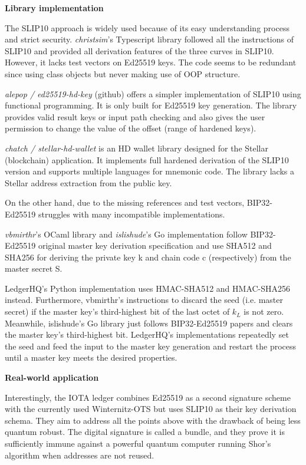 \bigskip
{\textbf{Library implementation}}

The SLIP10 approach is widely used because of its easy understanding process and strict security. \textit{christsim}'s Typescript library \cite{christsim} followed all the instructions of SLIP10 and provided all derivation features of the three curves in SLIP10. However, it lacks test vectors on Ed25519 keys. The code seems to be redundant since using class objects but never making use of OOP structure.

\textit{alepop / ed25519-hd-key} (github) \cite{alepop} offers a simpler implementation of SLIP10 using functional programming. It is only built for Ed25519 key generation. The library provides valid result keys or input path checking and also gives the user permission to change the value of the offset (range of hardened keys).

\textit{chatch / stellar-hd-wallet} is an HD wallet library designed for the Stellar (blockchain) application. It implements full hardened derivation of the SLIP10 version and supports multiple languages for mnemonic code. The library lacks a Stellar address extraction from the public key.

On the other hand, due to the missing references and test vectors, BIP32-Ed25519 struggles with many incompatible implementations.

\textit{vbmirthr}'s OCaml library \cite{vinc} and \textit{islishude}'s Go implementation \cite{Shude} follow BIP32-Ed25519 original master key derivation specification and use SHA512 and SHA256 for deriving the private key k and chain code c (respectively) from the master secret S.

LedgerHQ's Python implementation \cite{LedgerHQ} uses HMAC-SHA512 and HMAC-SHA256 instead.
Furthermore, vbmirthr's instructions to discard the seed (i.e. master secret) if the master key's third-highest bit of the last octet of $k_L$ is not zero. Meanwhile, islishude's Go library just follows BIP32-Ed25519 papers and clears the master key's third-highest bit. LedgerHQ's implementations repeatedly set the seed and feed the input to the master key generation and restart the process until a master key meets the desired properties.


\bigskip
{\textbf{Real-world application}}

Interestingly, the IOTA ledger combines Ed25519 as a second signature scheme with the currently used Winternitz-OTS \cite{IOTA} but uses SLIP10 as their key derivation schema.
They aim to address all the points above with the drawback of being less quantum robust. The digital signature is called a bundle, and they prove it is sufficiently immune against a powerful quantum computer running Shor’s algorithm \cite{shor} when addresses are not reused.

